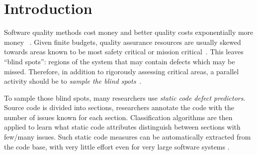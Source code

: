 \documentclass[sigconf,review, anonymous]{acmart}
\theoremstyle{break}
\theoremstyle{break}
\begin{document}

\maketitle


\section{Introduction}
\label{sect:intro}

Software quality methods cost money and better quality costs exponentially more money ~\cite{voas95, fu2016tuning}. Given finite budgets, quality assurance resources are usually 
skewed towards areas known to be most safety critical or mission critical~\cite{lowryBK98}. This leaves ``blind spots'': regions of the system that may contain defects which may be missed. Therefore, in addition to rigorously assessing  critical areas, a parallel activity should be to {\em sample the blind spots}~\cite{Menzies04}. 

To sample those blind spots, many researchers  use  {\em static code defect predictors}.
Source code is divided into sections, researchers annotate the code with the number of issues known for each section.
Classification algorithms are then applied to learn what static code attributes
distinguish 
between sections with few/many issues.
Such static code measures can be automatically extracted from
the code base, with very little effort even for very large software
systems \cite{nagappan2005static}.  
\end{document}

